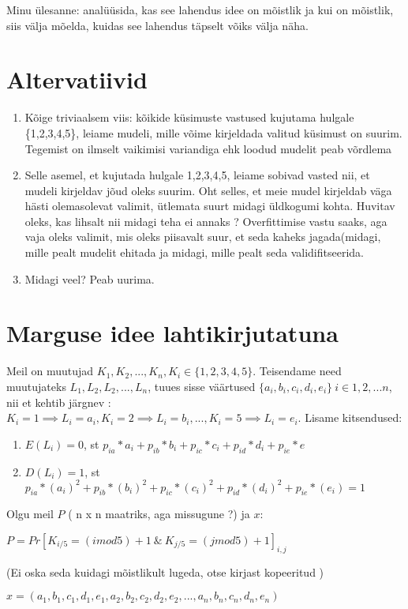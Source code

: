 \documentclass{article}
\newenvironment{tightcenter}{%
  \setlength\topsep{0pt}
  \setlength\parskip{0pt}
  \begin{center}
}{%
  \end{center}
}
\begin{document}
Minu \"ulesanne: analüüsida, kas see lahendus idee on mõistlik ja kui on mõistlik, siis välja mõelda, kuidas see lahendus täpselt võiks välja näha. 

\section*{Altervatiivid}

\begin{enumerate}
\item Kõige triviaalsem viis: kõikide k\"usimuste vastused kujutama hulgale \{1,2,3,4,5\}, leiame mudeli, mille võime kirjeldada valitud k\"usimust on suurim. Tegemist on ilmselt vaikimisi variandiga ehk loodud mudelit peab võrdlema 
\item Selle asemel, et kujutada hulgale {1,2,3,4,5}, leiame sobivad vasted nii, et mudeli kirjeldav jõud oleks suurim. Oht selles, et meie mudel kirjeldab väga hästi olemasolevat valimit, \"utlemata suurt midagi \"uldkogumi kohta. {\color{blue} Huvitav oleks, kas lihsalt nii midagi teha ei annaks ? Overfittimise vastu saaks, aga vaja oleks valimit, mis oleks piisavalt suur, et seda kaheks jagada(midagi, mille pealt mudelit ehitada ja midagi, mille pealt seda validifitseerida}. 
\item {\color{blue} Midagi veel? Peab uurima.}
\end{enumerate}

\section*{Marguse idee lahtikirjutatuna}


Meil on muutujad $K_1,K_2,...,K_n, K_i \in \{1,2,3,4,5\}$. Teisendame need muutujateks  $L_1, L_2,L_2,...,L_n$, tuues sisse väärtused $\{a_i,b_i,c_i,d_i,e_i\} ~ i \in {1,2,...n}$, nii et kehtib järgnev : $K_i = 1 \implies L_i = a_i, K_i = 2 \implies L_i = b_i,..., K_i = 5 \implies L_i = e_i$. Lisame kitsendused:
\begin{enumerate}
\item $E(L_i) = 0$, st $ p_{ia}*a_i+p_{ib}*b_i+p_{ic}*c_i+p_{id}*d_i+p_{ie}*e$

\item $D(L_i) = 1$, st $p_{ia}*(a_i)^2+ p_{ib}*(b_i)^2 + p_{ic}*(c_i)^2 + p_{id}*(d_i)^2 + p_{ie}*(e_i) = 1 $
\end{enumerate} 
Olgu meil $P$ {\color{cyan} ( n x n maatriks, aga missugune ?)} ja $x$: 
\vspace{10pt}
\begin{tightcenter}
$P = {Pr[K_{i/5} = (i mod 5) +1 ~ \&  ~ K_{j/5} = (j mod 5) +1]}_{i, j}$ 

{\color{cyan} (Ei oska seda kuidagi mõistlikult lugeda, otse kirjast kopeeritud )}
\end{tightcenter}
\vspace{10pt}
\begin{tightcenter}
$x = (a_1,b_1,c_1,d_1,e_1,a_2,b_2,c_2,d_2,e_2,...,a_n,b_n,c_n,d_n,e_n)$
\end{tightcenter}
\vspace{10pt}
\end{document}
